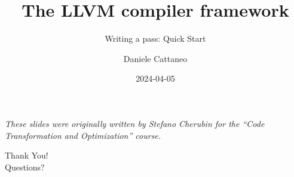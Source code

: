 

\author{Daniele Cattaneo}
\date{2024-04-05}
\title{The LLVM compiler framework}
\subtitle{Writing a pass: Quick Start}
\newcommand{\customdata}{Daniele Cattaneo <daniele.cattaneo@polimi.it>}






\begin{frame}
\maketitle
\begin{center}
\itshape\scriptsize
These slides were originally written by
Stefano Cherubin for the
``Code Transformation and Optimization'' course.
\end{center}
\end{frame}






\begin{frame}{}
\Huge\centering
Thank You!\\
\bigskip
\normalsize
Questions?
\end{frame}



